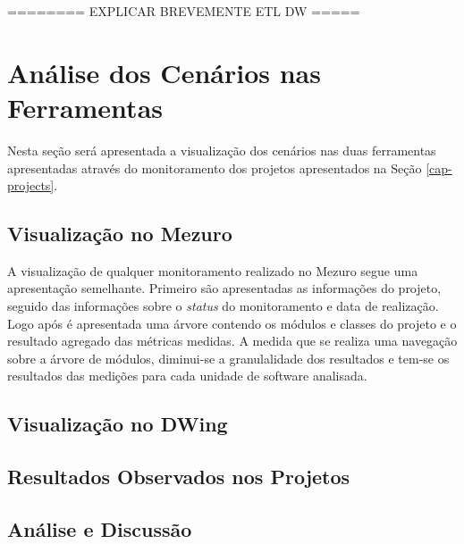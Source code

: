 ======== EXPLICAR BREVEMENTE ETL DW =====



\section{Análise dos Cenários nas Ferramentas}

Nesta seção será apresentada a visualização dos cenários nas duas ferramentas apresentadas através do monitoramento dos projetos apresentados na Seção \ref{cap-projects}.

\subsection{Visualização no Mezuro}
\label{vision-mezuro}

A visualização de qualquer monitoramento realizado no Mezuro segue uma apresentação semelhante. Primeiro são apresentadas as informações do projeto, seguido das informações sobre o \emph{status} do monitoramento e data de realização. Logo após é apresentada uma árvore contendo os módulos e classes do projeto e o resultado agregado das métricas medidas. A medida que se realiza uma navegação sobre a árvore de módulos, diminui-se a granulalidade dos resultados e tem-se os resultados das medições para cada unidade de software analisada.

\subsection{Visualização no DWing}
\label{vision-dw}

\subsection{Resultados Observados nos Projetos}
\label{results-projects}

\subsection{Análise e Discussão}
\label{ana-disc}
